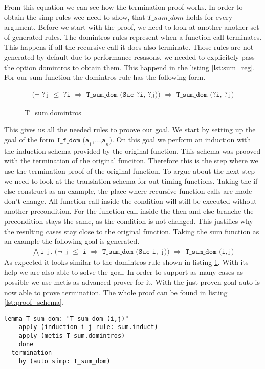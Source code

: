 From this equation we can see how the termination proof works.
In order to obtain the simp rules wee need to show, that $T\_sum\_dom$ holds for every argument.
Before we start with the proof, we need to look at another another set of generated rules.
The domintros rules represent when a function call terminates.
This happens if all the recursive call it does also terminate.
Those rules are not generated by default due to performance resasons, we needed to explicitely pass the option domintros to obtain them.
This happend in the listing \ref{lst:sum_reg}.
For our sum function the domintros rule has the following form.
\begin{figure}[H]
\begin{align*}
  \texttt{($\lnot$ ?j $\le$ ?i $\Longrightarrow$ T\_sum\_dom (Suc ?i, ?j)) $\Longrightarrow$ T\_sum\_dom (?i, ?j)}
\end{align*}
\caption{T\_sum.domintros}
\label{lst:domintros}
\end{figure}

This gives us all the needed rules to proove our goal.
We start by setting up the goal of the form $\texttt{T\_f\_dom (a}_{1}\texttt{,}\dots\texttt{,a}_{n}\texttt{)}$.
On this goal we perform an induction with the induction schema provided by the original function.
This schema was prooved with the termination of the original funciton.
Therefore this is the step where we use the termination proof of the original function.
To argue about the next step we need to look at the translation schema for out timing functions.
Taking the if-else construct as an example, the place where recursive function calls are made don't change.
All function call inside the condition will still be executed without another precondition.
For the function call inside the then and else branche the precondition stays the same, as the condition is not changed.
This justifies why the resulting cases stay close to the original function.
Taking the sum function as an example the following goal is generated.
\begin{align*}
  \texttt{$\bigwedge$i j. ($\lnot$ j $\le$ i $\Longrightarrow$ T\_sum\_dom (Suc i, j)) $\Longrightarrow$ T\_sum\_dom (i,j)}
\end{align*}
As expected it looks similar to the domintros rule shown in listing \ref{lst:domintros}.
With its help we are also able to solve the goal.
In order to support as many cases as possible we use metis as advanced prover for it.
With the just proven goal auto is now able to prove termination.
The whole proof can be found in listing \ref{lst:proof_schema}.
\begin{lstlisting}[language=isabelle,mathescape=true,label=lst:proof_schema,caption=Proof schema over dom with help of original function]
  lemma T_sum_dom: "T_sum_dom (i,j)"
    apply (induction i j rule: sum.induct)
    apply (metis T_sum.domintros)
    done
  termination
    by (auto simp: T_sum_dom)
\end{lstlisting}

